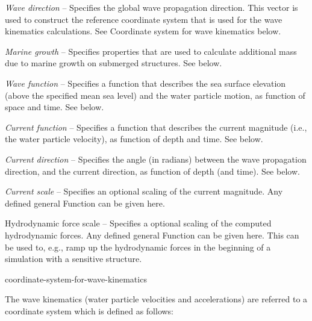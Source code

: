 \begin{bulletlist}
\item{\sl Wave direction} -- Specifies the global wave propagation direction.
  This vector is used to construct the reference coordinate system that is used
  for the wave kinematics calculations. See
             {Coordinate system for wave kinematics} below.
\item{\sl Marine growth} --
  Specifies properties that are used to calculate additional mass due to
  marine growth on submerged structures.
  See  below.
\item{\sl Wave function} --
  Specifies a function that describes the sea surface elevation
  (above the specified mean sea level) and the water particle motion,
  as function of space and time.
  See  below.
\item{\sl Current function} --
  Specifies a function that describes the current magnitude
  (i.e., the water particle velocity), as function of depth and time.
  See  below.
\item{\sl Current direction} --
  Specifies the angle (in radians) between the wave propagation direction,
  and the current direction, as function of depth (and time).
  See  below.
\item{\sl Current scale} --
  Specifies an optional scaling of the current magnitude.
  Any defined general Function can be given here.
\item{Hydrodynamic force scale} --
  Specifies a optional scaling of the computed hydrodynamic forces.
  Any defined general Function can be given here.
  This can be used to, e.g., ramp up the hydrodynamic forces in the beginning
  of a simulation with a sensitive structure.
\end{bulletlist}


           {coordinate-system-for-wave-kinematics}

The wave kinematics (water particle velocities and accelerations) are
referred to a coordinate system which is defined as follows:

